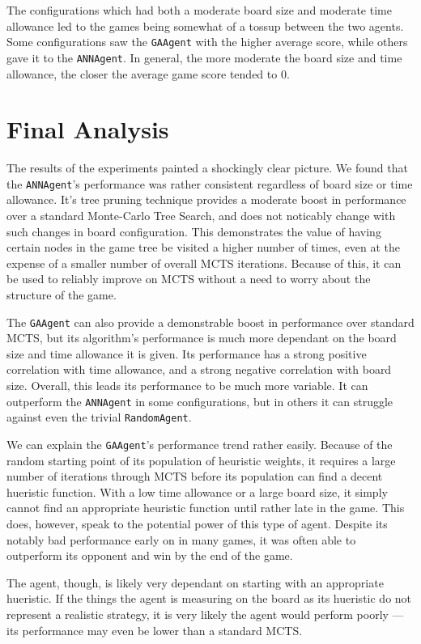 The configurations which had both a moderate board size and moderate time allowance led to the games being somewhat of a tossup between the two agents.  Some configurations saw the \texttt{GAAgent} with the higher average score, while others gave it to the \texttt{ANNAgent}.  In general, the more moderate the board size and time allowance, the closer the average game score tended to 0.

\section{Final Analysis}
The results of the experiments painted a shockingly clear picture.  We found that the \texttt{ANNAgent}'s performance was rather consistent regardless of board size or time allowance. It's tree pruning technique provides a moderate boost in performance over a standard Monte-Carlo Tree Search, and does not noticably change with such changes in board configuration.  This demonstrates the value of having certain nodes in the game tree be visited a higher number of times, even at the expense of a smaller number of overall MCTS iterations.  Because of this, it can be used to reliably improve on MCTS without a need to worry about the structure of the game.

The \texttt{GAAgent} can also provide a demonstrable boost in performance over standard MCTS, but its algorithm's performance is much more dependant on the board size and time allowance it is given.  Its performance has a strong positive correlation with time allowance, and a strong negative correlation with board size.  Overall, this leads its performance to be much more variable.  It can outperform the \texttt{ANNAgent} in some configurations, but in others it can struggle against even the trivial \texttt{RandomAgent}.

We can explain the \texttt{GAAgent}'s performance trend rather easily.  Because of the random starting point of its population of heuristic weights, it requires a large number of iterations through MCTS before its population can find a decent hueristic function.  With a low time allowance or a large board size, it simply cannot find an appropriate heuristic function until rather late in the game.  This does, however, speak to the potential power of this type of agent.  Despite its notably bad performance early on in many games, it was often able to outperform its opponent and win by the end of the game.

The agent, though, is likely very dependant on starting with an appropriate hueristic.  If the things the agent is measuring on the board as its hueristic do not represent a realistic strategy, it is very likely the agent would perform poorly --- its performance may even be lower than a standard MCTS.